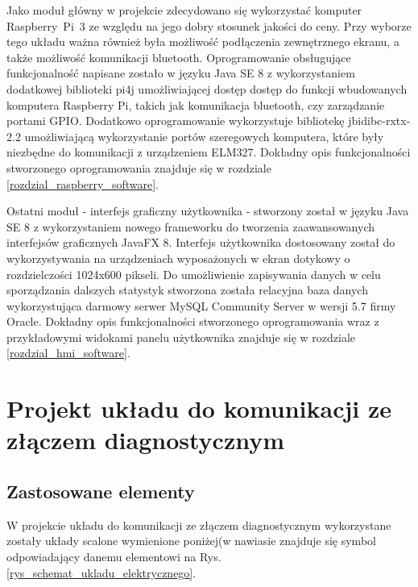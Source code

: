 \documentclass[12pt]{article} %
\numberwithin{equation}{subsection}
\numberwithin{figure}{section}
\numberwithin{table}{section}
\begin{document}
	\newpage
	
	Jako moduł główny w projekcie zdecydowano się wykorzystać komputer \mbox{Raspberry Pi 3} ze względu na jego dobry stosunek jakości do ceny. Przy wyborze tego układu ważna również była możliwość podłączenia zewnętrznego ekranu, a także możliwość komunikacji bluetooth. Oprogramowanie obsługujące funkcjonalność napisane zostało w języku Java SE 8 z wykorzystaniem dodatkowej biblioteki pi4j umożliwiającej dostęp dostęp do funkcji wbudowanych komputera Raspberry Pi, takich jak komunikacja bluetooth, czy zarządzanie portami GPIO. Dodatkowo oprogramowanie wykorzystuje bibliotekę jbidibc-rxtx-2.2 umożliwiającą wykorzystanie portów szeregowych komputera, które były niezbędne do komunikacji z urządzeniem ELM327. Dokładny opis funkcjonalności stworzonego oprogramowania znajduje się w rozdziale \ref{rozdzial_raspberry_software}.
	
	Ostatni moduł - interfejs graficzny użytkownika - stworzony został w języku Java SE 8 z wykorzystaniem nowego frameworku do tworzenia zaawansowanych interfejsów graficznych JavaFX 8. Interfejs użytkownika dostosowany został do wykorzystywania na urządzeniach wyposażonych w ekran dotykowy o rozdzielczości 1024x600 pikseli. Do umożliwienie zapisywania danych w celu sporządzania dalszych statystyk stworzona została relacyjna baza danych wykorzystująca darmowy serwer MySQL Community Server w wersji 5.7 firmy Oracle. Dokładny opis funkcjonalności stworzonego oprogramowania wraz z przykładowymi widokami panelu użytkownika znajduje się w rozdziale \ref{rozdzial_hmi_software}.
	
	
	
	\newpage	
	
\section{Projekt układu do komunikacji ze złączem diagnostycznym} \label{rozdzial_uklad_stm}
	\subsection{Zastosowane elementy}W projekcie układu do komunikacji ze złączem diagnostycznym wykorzystane zostały układy scalone wymienione poniżej(w nawiasie znajduje się symbol odpowiadający danemu elementowi na Rys. \ref{rys_schemat_ukladu_elektrycznego}.
	
\end{document}
